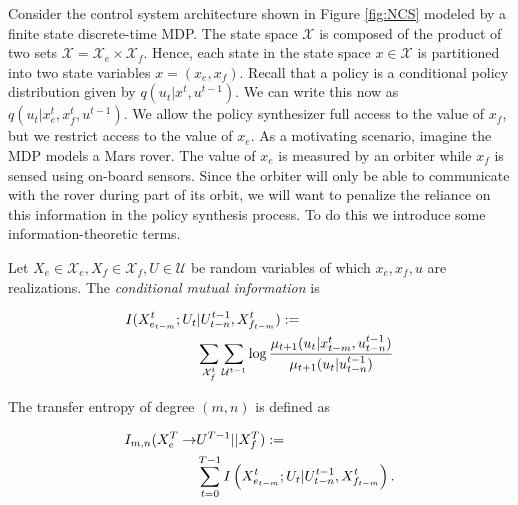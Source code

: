 Consider the control system architecture shown in Figure \ref{fig:NCS} modeled by a finite state discrete-time MDP. The state space $\mathcal{X}$ is composed of the product of two sets  $\mathcal{X} = \mathcal{X}_e \times \mathcal{X}_f$. Hence, each state in the state space $x \in \mathcal{X}$ is partitioned into two state variables $x = (x_e,x_f)$. Recall that a policy is a conditional policy distribution given by $q(u_t|x^t,u^{t-1})$. We can write this now as $q(u_t|x_e^t,x_f^t,u^{t-1})$. We allow the policy synthesizer full access to the value of $x_f$, but we restrict access to the value of $x_e$. As a motivating scenario, imagine the MDP models a Mars rover. The value of $x_e$ is measured by an orbiter while $x_f$ is sensed using on-board sensors. Since the orbiter will only be able to communicate with the rover during part of its orbit, we will want to penalize the reliance on this information in the policy synthesis process. To do this we introduce some information-theoretic terms. 



Let $X_e \in \mathcal{X}_e,X_f \in \mathcal{X}_f,U\in \mathcal{U}$ be random variables of which $x_e,x_f,u$ are realizations. The \emph{conditional mutual information} is 

\begin{align*}
I  (X_{e_{t-m}}^t;U_t & \vert U^{t-1}_{t-n},X_{f_{t-m}}^{t}) := \nonumber \\ &\sum_{\mathcal{X}^{t}_f}\sum_{\mathcal{U}^{t-1}}\log\frac{\mu_{t+1}(u_t|x_{t-m}^{t},u_{t-n}^{t-1})}{\mu_{t+1}(u_t\vert u_{t-n}^{t-1})}
\end{align*}



The transfer entropy of degree $(m,n)$ is defined as \cite{schreiber2000}

\begin{align}\label{eqn:TEcond}
I_{m,n}(X_e^T  \rightarrow & U^{T-1}||X_f^T) := \nonumber \\ & \sum_{t=0}^{T-1} I\left(X_{e_{t-m}}^t;U_t|U^{t-1}_{t-n},X_{f_{t-m}}^{t} \right) .
\end{align}






